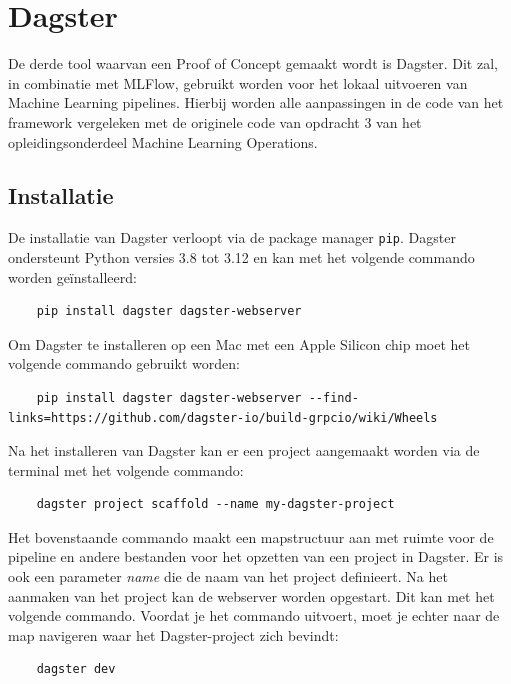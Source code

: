 \section{Dagster}
De derde tool waarvan een Proof of Concept gemaakt wordt is Dagster. Dit zal, in combinatie met MLFlow, gebruikt worden voor het lokaal uitvoeren van Machine Learning pipelines. Hierbij worden alle aanpassingen in de code van het framework vergeleken met de originele code van opdracht 3 van het opleidingsonderdeel Machine Learning Operations.
\subsection{Installatie}
De installatie van Dagster verloopt via de package manager \texttt{pip}. Dagster ondersteunt Python versies 3.8 tot 3.12 en kan met het volgende commando worden geïnstalleerd:
\begin{verbatim}
    pip install dagster dagster-webserver
\end{verbatim}
Om Dagster te installeren op een Mac met een Apple Silicon chip moet het volgende commando gebruikt worden:
\begin{verbatim}
    pip install dagster dagster-webserver --find-links=https://github.com/dagster-io/build-grpcio/wiki/Wheels
\end{verbatim}
Na het installeren van Dagster kan er een project aangemaakt worden via de terminal met het volgende commando:
\begin{verbatim}
    dagster project scaffold --name my-dagster-project
\end{verbatim}
Het bovenstaande commando maakt een mapstructuur aan met ruimte voor de pipeline en andere bestanden voor het opzetten van een project in Dagster. Er is ook een parameter \textit{name} die de naam van het project definieert.
Na het aanmaken van het project kan de webserver worden opgestart. Dit kan met het volgende commando. Voordat je het commando uitvoert, moet je echter naar de map navigeren waar het Dagster-project zich bevindt:
\begin{verbatim}
    dagster dev
\end{verbatim}

